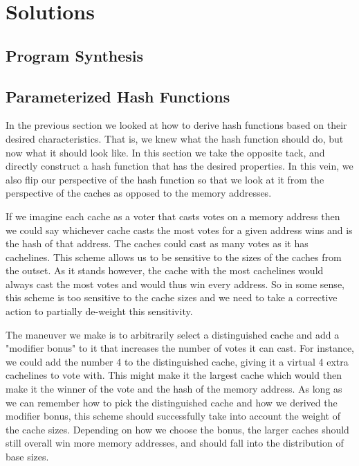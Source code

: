 \section{Solutions}
\label{sec:Solution}

\subsection{Program Synthesis}

\subsection{Parameterized Hash Functions}

In the previous section we looked at how to derive hash functions based on their
desired characteristics. That is, we knew what the hash function should do, but
now what it should look like. In this section we take the opposite tack, and
directly construct a hash function that has the desired properties. In this
vein, we also flip our perspective of the hash function so that we look at it
from the perspective of the caches as opposed to the memory addresses.

If we imagine each cache as a voter that casts votes on a memory address then we
could say whichever cache casts the most votes for a given address wins and is
the hash of that address. The caches could cast as many votes as it has
cachelines. This scheme allows us to be sensitive to the sizes of the caches
from the outset. As it stands however, the cache with the most cachelines would
always cast the most votes and would thus win every address.  So in some sense,
this scheme is too sensitive to the cache sizes and we need to take a corrective
action to partially de-weight this sensitivity.

The maneuver we make is to arbitrarily select a distinguished cache and add a
"modifier bonus" to it that increases the number of votes it can cast. For
instance, we could add the number 4 to the distinguished cache, giving it a
virtual 4 extra cachelines to vote with. This might make it the largest cache
which would then make it the winner of the vote and the hash of the memory
address. As long as we can remember how to pick the distinguished cache and how
we derived the modifier bonus, this scheme should successfully take into account
the weight of the cache sizes. Depending on how we choose the bonus, the larger
caches should still overall win more memory addresses, and should fall into the
distribution of base sizes.

